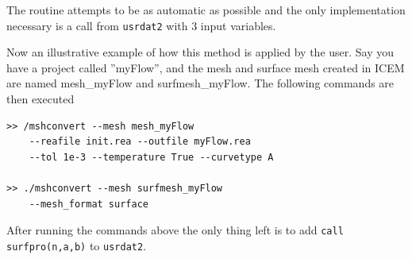 The routine attempts to be as automatic as possible and the only implementation necessary is 
a call from \verb|usrdat2| with 3 input variables.

Now an illustrative example of how this method is applied by the user. Say you have a project
called ''myFlow'', and the mesh and surface mesh created in ICEM are named mesh\_myFlow and 
surfmesh\_myFlow. The following commands are then executed

%

% 
\begingroup
\fontsize{12pt}{14pt}
\begin{lstlisting}[escapechar=|,frame=none]
>> /mshconvert --mesh mesh_myFlow 
    --reafile init.rea --outfile myFlow.rea
    --tol 1e-3 --temperature True --curvetype A

>> ./mshconvert --mesh surfmesh_myFlow 
    --mesh_format surface

\end{lstlisting}
\endgroup
After running the commands above the only thing left is to 
add \verb|call surfpro(n,a,b)| to \verb|usrdat2|.
% 
% 
